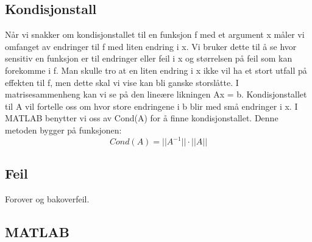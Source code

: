  \subsection{Kondisjonstall}
 Når vi snakker om kondisjonstallet til en funksjon f med et argument x måler vi omfanget av endringer til f med liten endring i x. Vi bruker dette til å se hvor sensitiv en funksjon er til endringer eller feil i x og størrelsen på feil som kan forekomme i f. Man skulle tro at en liten endring i x ikke vil ha et stort utfall på effekten til f, men dette skal vi vise kan bli ganske storslåtte. I matrisesammenheng kan vi se på den lineære likningen Ax = b. Kondisjonstallet til A vil fortelle oss om hvor store endringene i b blir med små endringer i x. I MATLAB benytter vi oss av Cond(A) for å finne kondisjonstallet. Denne metoden bygger på funksjonen:
 \
 \begin{equation}
 Cond(A) = ||A^{-1}|| \cdot ||A||
 \end{equation}
 
 

\subsection{Feil}
Forover og bakoverfeil.
 
\subsection{MATLAB}
